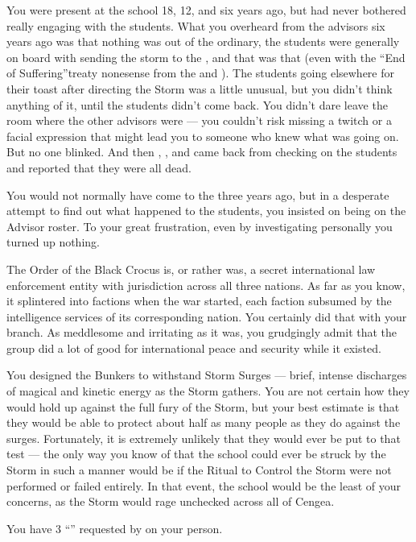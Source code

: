 \documentclass[char]{GL2020}
\begin{document}
\begin{itemz}[Notes]
    \item You were present at the school 18, 12, and six years ago, but had never bothered really engaging with the students. What you overheard from the advisors six years ago was that nothing was out of the ordinary, the students were generally on board with sending the storm to the \pTech{}, and that was that (even with the ``End of Suffering''treaty nonesense from the \pFarm{} and \pTech{}). The students going elsewhere for their toast after directing the Storm was a little unusual, but you didn't think anything of it, until the students didn't come back. You didn't dare leave the room where the other advisors were — you couldn't risk missing a twitch or a facial expression that might lead you to someone who knew what was going on. But no one blinked. And then \cPrincipal{}, \cDiplomat{\intro}, and \cMusic{\intro} came back from checking on the students and reported that they were all dead.
    \item You would not normally have come to the \pSc{} three years ago, but in a desperate attempt to find out what happened to the students, you insisted on being on the Advisor roster. To your great frustration, even by investigating personally you turned up nothing.
    \item The Order of the Black Crocus is, or rather was, a secret international law enforcement entity with jurisdiction across all three nations. As far as you know, it splintered into factions when the war started, each faction subsumed by the intelligence services of its corresponding nation. You certainly did that with your branch. As meddlesome and irritating as it was, you grudgingly admit that the group did a lot of good for international peace and security while it existed.
    \item You designed the Bunkers to withstand Storm Surges — brief, intense discharges of magical and kinetic energy as the Storm gathers. You are not certain how they would hold up against the full fury of the Storm, but your best estimate is that they would be able to protect about half as many people as they do against the surges. Fortunately, it is extremely unlikely that they would ever be put to that test — the only way you know of that the school could ever be struck by the Storm in such a manner would be if the Ritual to Control the Storm were not performed or failed entirely. In that event, the school would be the least of your concerns, as the Storm would rage unchecked across all of Cengea.
    \item You have 3 ``\iMagitechParts{}'' requested by \cTechStar{} on your person. 
\end{itemz}
\end{document}
